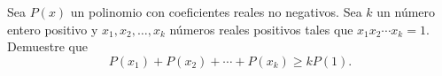 Sea $P(x)$ un polinomio con coeficientes reales no negativos. Sea $k$ un número entero positivo y $x_1, x_2, \dots, x_k$ números reales positivos tales que $x_1x_2\cdots x_k=1$. Demuestre que
\[ P(x_1)+P(x_2)+\cdots+P(x_k)\geq kP(1). \]


